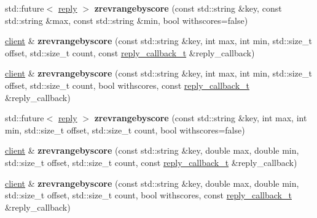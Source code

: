 \begin{DoxyCompactItemize}
\item 
\mbox{\label{classcpp__redis_1_1client_a6e5f0bb9b73d052bca725ddf55101687}} 
std\+::future$<$ \hyperlink{classcpp__redis_1_1reply}{reply} $>$ {\bfseries zrevrangebyscore} (const std\+::string \&key, const std\+::string \&max, const std\+::string \&min, bool withscores=false)
\item 
\mbox{\label{classcpp__redis_1_1client_a1a2eb62d672e005737a60c1e5329588e}} 
\hyperlink{classcpp__redis_1_1client}{client} \& {\bfseries zrevrangebyscore} (const std\+::string \&key, int max, int min, std\+::size\+\_\+t offset, std\+::size\+\_\+t count, const \hyperlink{classcpp__redis_1_1client_a061a1140d36d2eaeda82b09a0bb3f9f2}{reply\+\_\+callback\+\_\+t} \&reply\+\_\+callback)
\item 
\mbox{\label{classcpp__redis_1_1client_a388739c16ff65eca8644aa20e352d4b4}} 
\hyperlink{classcpp__redis_1_1client}{client} \& {\bfseries zrevrangebyscore} (const std\+::string \&key, int max, int min, std\+::size\+\_\+t offset, std\+::size\+\_\+t count, bool withscores, const \hyperlink{classcpp__redis_1_1client_a061a1140d36d2eaeda82b09a0bb3f9f2}{reply\+\_\+callback\+\_\+t} \&reply\+\_\+callback)
\item 
\mbox{\label{classcpp__redis_1_1client_af946f0c3682a80862d28bf6657ce101b}} 
std\+::future$<$ \hyperlink{classcpp__redis_1_1reply}{reply} $>$ {\bfseries zrevrangebyscore} (const std\+::string \&key, int max, int min, std\+::size\+\_\+t offset, std\+::size\+\_\+t count, bool withscores=false)
\item 
\mbox{\label{classcpp__redis_1_1client_a3c5bf92f09868f24a920778af3a5c1ed}} 
\hyperlink{classcpp__redis_1_1client}{client} \& {\bfseries zrevrangebyscore} (const std\+::string \&key, double max, double min, std\+::size\+\_\+t offset, std\+::size\+\_\+t count, const \hyperlink{classcpp__redis_1_1client_a061a1140d36d2eaeda82b09a0bb3f9f2}{reply\+\_\+callback\+\_\+t} \&reply\+\_\+callback)
\item 
\mbox{\label{classcpp__redis_1_1client_aed031357e0c9ed08a898a20bb989860d}} 
\hyperlink{classcpp__redis_1_1client}{client} \& {\bfseries zrevrangebyscore} (const std\+::string \&key, double max, double min, std\+::size\+\_\+t offset, std\+::size\+\_\+t count, bool withscores, const \hyperlink{classcpp__redis_1_1client_a061a1140d36d2eaeda82b09a0bb3f9f2}{reply\+\_\+callback\+\_\+t} \&reply\+\_\+callback)

\end{DoxyCompactItemize}
